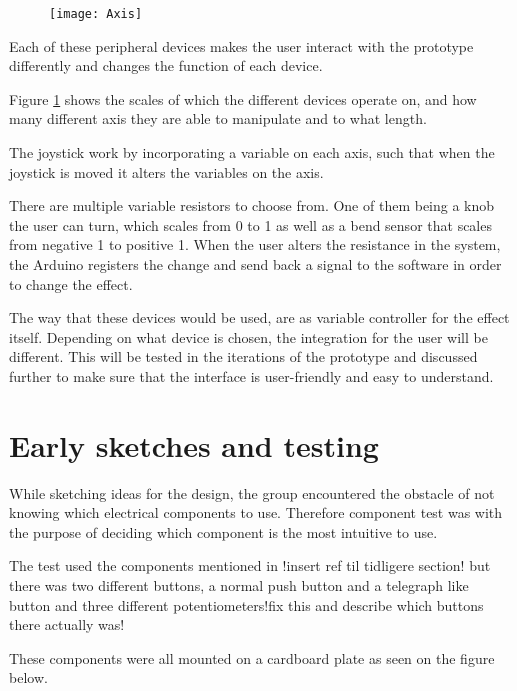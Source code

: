 \begin{figure}[!h] 
\centering
\texttt{[image: Axis]}
\caption{\label{fig:axis}}
\end{figure}



Each of these peripheral devices makes the user interact with the prototype differently and changes the function of each device.

Figure \ref{fig:axis} shows the scales of which the different devices operate on, and how many different axis they are able to manipulate and to what length.
 
The joystick work by incorporating a variable on each axis, such that when the joystick is moved it alters the variables on the axis. 

There are multiple variable resistors to choose from. One of them being a knob the user can turn, which scales from 0 to 1 as well as a bend sensor that scales from negative 1 to positive 1. When the user alters the resistance in the system, the Arduino registers the change and send back a signal to the software in order to change the effect.

The way that these devices would be used, are as variable controller for the effect itself. Depending on what device is chosen, the integration for the user will be different. This will be tested in the iterations of the prototype and discussed further to make sure that the interface is user-friendly and easy to understand. 


\section{Early sketches and testing}
While sketching ideas for the design, the group encountered the obstacle of not knowing which electrical components to use. Therefore component test was with the purpose of deciding which component is the most intuitive to use. 

The test used the components mentioned in !insert ref til tidligere section! but there was two different buttons, a normal push button and a telegraph like button and three different potentiometers!fix this and describe which buttons there actually was!

These components were all mounted on a cardboard plate as seen on the figure below.

